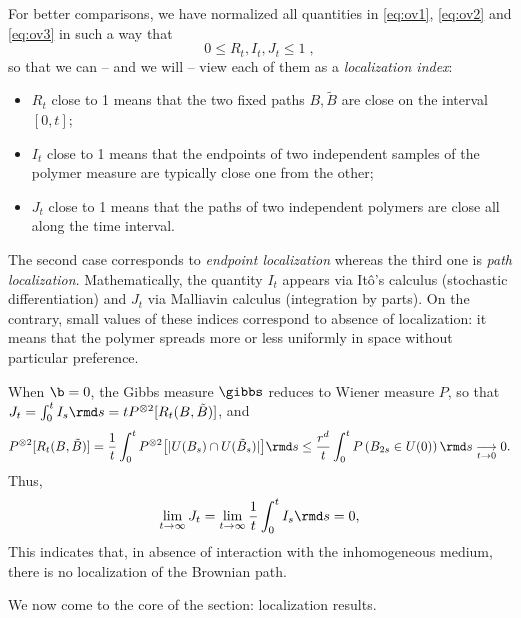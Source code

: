 \medskip

For better comparisons, we have normalized all quantities in \eqref{eq:ov1}, \eqref{eq:ov2} and \eqref{eq:ov3}  in such a way that
$$
0 \leq R_t, I_t, J_t \leq 1 \;,
$$
so that we can -- and we will -- view each of them as a \emph{localization index}:
\begin{itemize}
\item   $R_t$ close to 1 means that the two fixed paths $B, \tilde B$ are close on the interval $[0,t]$;
\item $I_t$  close to 1 means that the endpoints of two independent samples of the polymer measure are typically close one from the other;
\item $J_t$ close to 1 means that the paths of two independent polymers are close all along the time interval.
\end{itemize}
The second case corresponds to \emph{endpoint localization} whereas the third one is  \emph{path localization}. 
Mathematically, the quantity $I_t$ appears via It\^o's calculus (stochastic differentiation) and $J_t$ via Malliavin calculus (integration by parts).
On the contrary, small values of these indices correspond to
absence of localization: it means that the polymer spreads more or less uniformly in space without particular preference.


%

\begin{remark} 
When $\b = 0$, the Gibbs measure $\gibbs$ reduces to Wiener measure $P$, so that $J_t = \int_0^t I_s \rmd s = t P^{\otimes 2} [R_t(B,\tilde{B})]$, and
\[P^{\otimes 2} [R_t(B,\tilde{B})] = \frac{1}{t} \int_0^t P^{\otimes 2} \big[|U(B_s)\cap U(\tilde{B}_s)|\big] \rmd s \leq \frac{r^d}{t} \int_0^t P\left(B_{2s}\in U(0)\right) \rmd s \underset{t\to 0}{\longrightarrow} 0 .\] Thus, \[\lim_{t\to\infty}  J_t = \lim_{t\to\infty} \frac{1}{t} \int_0^t I_s \rmd s = 0,\] 
This indicates that, in absence of interaction with the inhomogeneous medium,  there is no localization of the Brownian path.
\end{remark} 
We now come to the core of the section: localization results.
